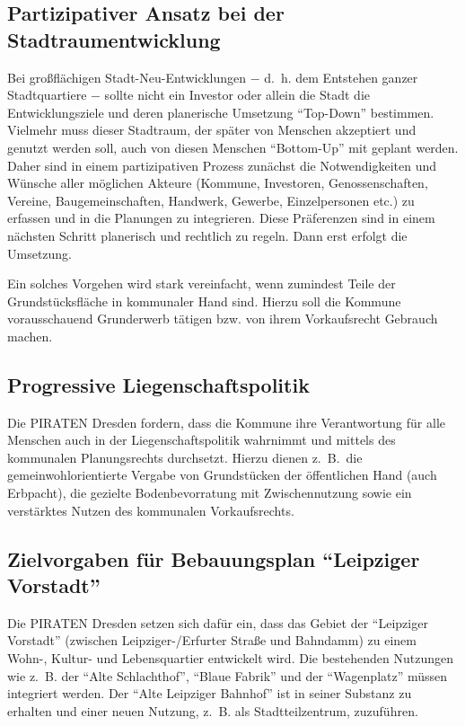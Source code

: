 \documentclass[a4paper, 11pt]{article}
\begin{document}
\subsection{Partizipativer Ansatz bei der Stadtraumentwicklung}
Bei großflächigen Stadt-Neu-Entwicklungen $-$ d. h. dem Entstehen ganzer Stadtquartiere $-$ sollte nicht ein Investor oder allein die Stadt die Entwicklungsziele und deren planerische Umsetzung ``Top-Down'' bestimmen. Vielmehr muss dieser Stadtraum, der später von Menschen akzeptiert und genutzt werden soll, auch von diesen Menschen ``Bottom-Up'' mit geplant werden. Daher sind in einem partizipativen Prozess zunächst die Notwendigkeiten und Wünsche aller möglichen Akteure (Kommune, Investoren, Genossenschaften, Vereine, Baugemeinschaften, Handwerk, Gewerbe, Einzelpersonen etc.) zu erfassen und in die Planungen zu integrieren. Diese Präferenzen sind in einem nächsten Schritt planerisch und rechtlich zu regeln. Dann erst erfolgt die Umsetzung.\newline

Ein solches Vorgehen wird stark vereinfacht, wenn zumindest Teile der Grundstücksfläche in kommunaler Hand sind. Hierzu soll die Kommune vorausschauend Grunderwerb tätigen bzw. von ihrem Vorkaufsrecht Gebrauch machen.


\subsection{Progressive Liegenschaftspolitik}
Die PIRATEN Dresden fordern, dass die Kommune ihre Verantwortung für alle Menschen auch in der Liegenschaftspolitik wahrnimmt und mittels des kommunalen Planungsrechts durchsetzt. Hierzu dienen z. B.~die gemeinwohlorientierte Vergabe von Grundstücken der öffentlichen Hand (auch Erbpacht), die gezielte Bodenbevorratung mit Zwischennutzung sowie ein verstärktes Nutzen des kommunalen Vorkaufsrechts.


\subsection{Zielvorgaben für Bebauungsplan ``Leipziger Vorstadt''}
Die PIRATEN Dresden setzen sich dafür ein, dass das Gebiet der ``Leipziger Vorstadt'' (zwischen Leipziger-/Erfurter Straße und Bahndamm) zu einem Wohn-, Kultur- und Lebensquartier entwickelt wird. Die bestehenden Nutzungen wie z. B. der ``Alte Schlachthof'', ``Blaue Fabrik'' und der ``Wagenplatz'' müssen integriert werden. Der ``Alte Leipziger Bahnhof'' ist in seiner Substanz zu erhalten und einer neuen Nutzung, z. B. als Stadtteilzentrum, zuzuführen.\newline
\end{document}
